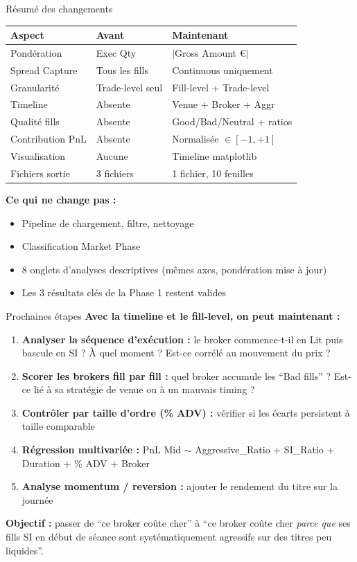 \documentclass[10pt]{beamer}
\begin{document}
\begin{frame}{Résumé des changements}

\begin{tabular}{lll}
\toprule
\textbf{Aspect} & \textbf{Avant} & \textbf{Maintenant} \\
\midrule
Pondération & Exec Qty & $|$Gross Amount \euro{}$|$ \\
Spread Capture & Tous les fills & Continuous uniquement \\
Granularité & Trade-level seul & Fill-level + Trade-level \\
Timeline & Absente & Venue + Broker + Aggr \\
Qualité fills & Absente & Good/Bad/Neutral + ratios \\
Contribution PnL & Absente & Normalisée $\in [-1, +1]$ \\
Visualisation & Aucune & Timeline matplotlib \\
Fichiers sortie & 3 fichiers & 1 fichier, 10 feuilles \\
\bottomrule
\end{tabular}

\vspace{0.4cm}
\textbf{Ce qui ne change pas :}
\begin{itemize}
    \item Pipeline de chargement, filtre, nettoyage
    \item Classification Market Phase
    \item 8 onglets d'analyses descriptives (mêmes axes, pondération mise à jour)
    \item Les 3 résultats clés de la Phase 1 restent valides
\end{itemize}
\end{frame}

\begin{frame}{Prochaines étapes}
\textbf{Avec la timeline et le fill-level, on peut maintenant :}

\begin{enumerate}
    \item \textbf{Analyser la séquence d'exécution :} le broker commence-t-il en Lit puis bascule en SI ? À quel moment ? Est-ce corrélé au mouvement du prix ?
    \item \textbf{Scorer les brokers fill par fill :} quel broker accumule les ``Bad fills'' ? Est-ce lié à sa stratégie de venue ou à un mauvais timing ?
    \item \textbf{Contrôler par taille d'ordre (\% ADV) :} vérifier si les écarts persistent à taille comparable
    \item \textbf{Régression multivariée :} PnL Mid $\sim$ Aggressive\_Ratio + SI\_Ratio + Duration + \% ADV + Broker
    \item \textbf{Analyse momentum / reversion :} ajouter le rendement du titre sur la journée
\end{enumerate}

\vspace{0.3cm}
\textbf{Objectif :} passer de ``ce broker coûte cher'' à ``ce broker coûte cher \textit{parce que} ses fills SI en début de séance sont systématiquement agressifs sur des titres peu liquides''.
\end{frame}
\end{document}
